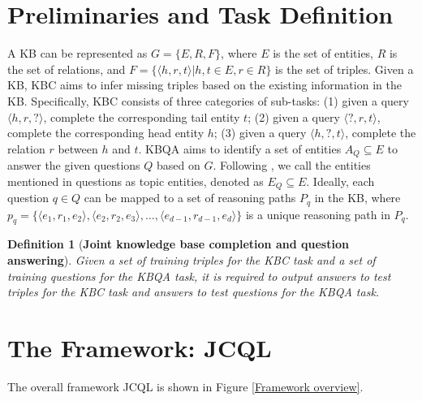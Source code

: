 \documentclass[11pt]{article}
\newtheorem{definition}{Definition}
\begin{document}
\section{Preliminaries and Task Definition}
A KB can be represented as $G=\{E,R,F\}$, where $E$ is the set of entities, $R$ is the set of relations, and $F=\{\langle h,r,t\rangle|h,t \in E, r \in R\}$ is the set of triples. 
Given a KB, KBC aims to infer missing triples based on the existing information in the KB. Specifically, KBC consists of three categories of sub-tasks: (1) given a query $\langle h,r,?\rangle$, complete the corresponding tail entity $t$; (2) given a query $\langle ?,r,t\rangle$, complete the corresponding head entity $h$; (3) given a query $\langle h,?,t\rangle$, complete the relation $r$ between $h$ and $t$.
KBQA aims to identify a set of entities $A_Q \subseteq E$ to answer the given questions $Q$ based on $G$. Following \cite{lihui2022binet}, we call the entities mentioned in questions as topic entities, denoted as $E_Q \subseteq E$. Ideally, each question $q \in Q$ can be mapped to a set of reasoning paths $P_q$ in the KB, where $p_q=\{\langle e_1,r_1,e_2\rangle, \langle e_2,r_2,e_3\rangle, \dots, \langle e_{d-1},r_{d-1},e_d\rangle\}$ is a unique reasoning path in $P_q$. 
\begin{definition}[\textbf{Joint knowledge base completion and question answering}] 
Given a set of training triples for the KBC task and a set of training questions for the KBQA task, it is required to output answers to test triples for the KBC task and answers to test questions for the KBQA task.
\end{definition}

\section{The Framework: JCQL}
The overall framework JCQL is shown in Figure \ref{Framework overview}.
\end{document}
